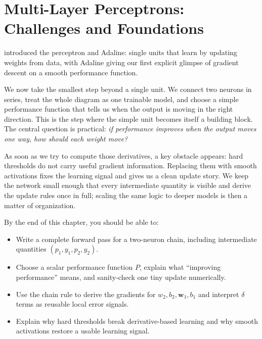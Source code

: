 \section{Multi-Layer Perceptrons: Challenges and Foundations}\label{chap:mlp}

 introduced the perceptron and Adaline: single units that learn by updating weights from data, with Adaline giving our first explicit glimpse of gradient descent on a smooth performance function.

We now take the smallest step beyond a single unit. We connect two neurons in series, treat the whole diagram as one trainable model, and choose a simple performance function that tells us when the output is moving in the right direction. This is the step where the simple unit becomes itself a building block. The central question is practical: \emph{if performance improves when the output moves one way, how should each weight move?}

As soon as we try to compute those derivatives, a key obstacle appears: hard thresholds do not carry useful gradient information. Replacing them with smooth activations fixes the learning signal and gives us a clean update story. We keep the network small enough that every intermediate quantity is visible and derive the update rules once in full; scaling the same logic to deeper models is then a matter of organization.

\begin{tcolorbox}[summarybox, title={Learning Outcomes}]
By the end of this chapter, you should be able to:
\begin{itemize}
    \item Write a complete forward pass for a two\hyp{}neuron chain, including intermediate quantities \((p_1,y_1,p_2,y_2)\).
    \item Choose a scalar performance function \(P\), explain what ``improving performance'' means, and sanity\hyp{}check one tiny update numerically.
    \item Use the chain rule to derive the gradients for \(w_2,b_2,\mathbf{w}_1,b_1\) and interpret \(\delta\) terms as reusable local error signals.
    \item Explain why hard thresholds break derivative\hyp{}based learning and why smooth activations restore a usable learning signal.
\end{itemize}
\end{tcolorbox}

